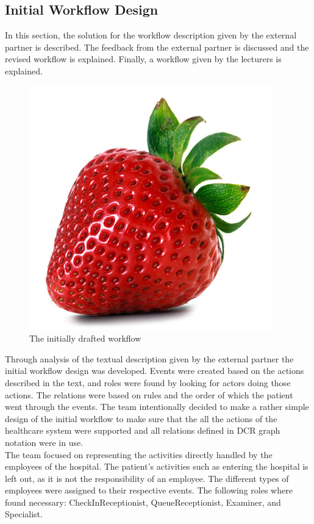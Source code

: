 \subsection{Initial Workflow Design}
In this section, the solution for the workflow description given by the external partner is described. The feedback from the external partner is discussed and the revised workflow is explained. Finally, a workflow given by the lecturers is explained.

\begin{figure}
\centering
\includegraphics[width=0.5\linewidth]{Figures/strawberry}
\caption{\label{fig:InitialWorkflowDesign} The initially drafted workflow}
\end{figure}

Through analysis of the textual description given by the external partner the initial workflow design was developed. Events were created based on the actions described in the text, and roles were found by looking for actors doing those actions. The relations were based on rules and the order of which the patient went through the events.\newline
The team intentionally decided to make a rather simple design of the initial workflow to make sure that the all the actions of the healthcare system were supported and all relations defined in DCR graph notation were in use. \\

The team focused on representing the activities directly handled by the employees of the hospital. The patient’s activities such as entering the hospital is left out, as it is not the responsibility of an employee. The different types of employees were assigned to their respective events. The following roles where found necessary: CheckInReceptionist, QueueReceptionist, Examiner, and Specialist. \\

